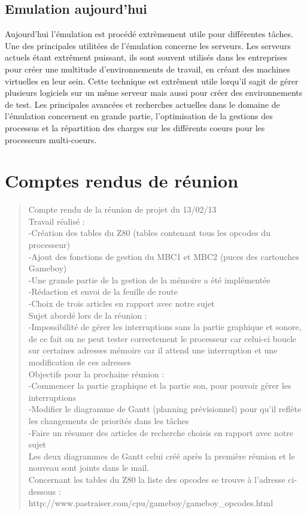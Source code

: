 \documentclass{report}
\begin{document}
\section*{Emulation aujourd'hui}
Aujourd'hui l'émulation est procédé extrèmement utile pour différentes tâches. Une des principales utilitées de l'émulation concerne les serveurs. Les serveurs actuels étant extrêment puissant, ils sont souvent utilisés dans les entreprises pour créer une multitude d'environnements de travail, en créant des machines virtuelles en leur sein. Cette technique est extrêment utile lorqu'il sagit de gérer plusieurs logiciels sur un même serveur mais aussi pour créer des environnements de test. 
Les principales avancées et recherches actuelles dans le domaine de l'émulation concernent en grande partie, l'optimisation de la gestions des processus et la répartition des charges sur les différents coeurs pour les processeurs multi-coeurs.


\appendix
\chapter{Comptes rendus de réunion}
\begin{quotation}
Compte rendu de la réunion de projet du 13/02/13\\
Travail réalisé :\\
	-Création des tables du Z80 (tables contenant tous les opcodes du processeur)\\
	-Ajout des fonctions de gestion du MBC1 et MBC2 (puces des cartouches Gameboy)\\
	-Une grande partie de la gestion de la mémoire a été implémentée\\
	-Rédaction et envoi de la feuille de route\\
	-Choix de trois articles en rapport avec notre sujet\\
Sujet abordé lors de la réunion :\\
	-Impossibilité de gérer les interruptions sans la partie graphique et sonore, de ce fait on ne peut tester correctement le processeur car celui-ci boucle sur certaines adresses mémoire car il attend une interruption et une modification de ces adresses\\
Objectifs pour la prochaine réunion :\\
	-Commencer la partie graphique et la partie son, pour pouvoir gérer les interruptions\\
	-Modifier le diagramme de Gantt (planning prévisionnel) pour qu’il reflète les changements de priorités dans les tâches\\
	-Faire un résumer des articles de recherche choisis en rapport avec notre sujet\\

Les deux diagrammes de Gantt celui créé après la première réunion et le nouveau sont joints dans le mail.\\
Concernant les tables du Z80 la liste des opcodes se trouve à l’adresse ci-dessous : http://www.pastraiser.com/cpu/gameboy/gameboy\_opcodes.html\\
\end{quotation}
\end{document}
